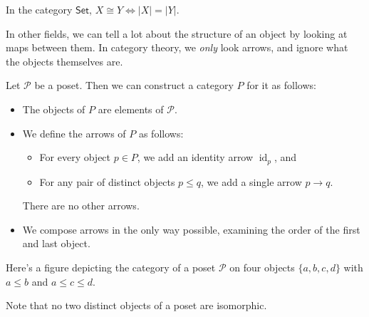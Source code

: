 \begin{remark}
    In the category $\mathsf{Set}$, $X\cong Y \iff |X|=|Y|$.
\end{remark}
In other fields, we can tell a lot about the structure of an object by looking at maps between them. In category theory, we \emph{only} look arrows, and ignore what the objects themselves are.
\begin{example}
   Let $\mathcal{P} $ be a poset. Then we can construct a category $P$ for it as follows:
   \begin{itemize}
       \item The objects of $P$ are elements of $\mathcal{P} $.
    \item We define the arrows of $P$ as follows:
        \begin{itemize}
            \item For every object $p\in P$, we add an identity arrow $\operatorname{id}_p$, and 
            \item For any pair of distinct objects $p\leq q$, we add a single arrow $p\to q$. 
        \end{itemize}
        There are no other arrows.
    \item We compose arrows in the only way possible, examining the order of the first and last object.
   \end{itemize}
   Here's a figure depicting the category of a poset $\mathcal{P} $ on four objects $\{a,b,c,d\} $ with $a\leq b$ and $a\leq c\leq d$.
            \begin{figure}[H]
                \centering
            \end{figure}
            Note that no two distinct objects of a poset are isomorphic.
\end{example}
